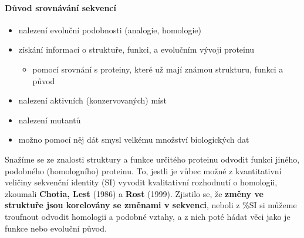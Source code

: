 \documentclass[DIV=8]{scrreprt}
\begin{document}
\paragraph{Důvod srovnávání sekvencí}
\begin{itemize}[nosep]
    \item nalezení evoluční podobnosti (analogie, homologie)
    \item získání informací o struktuře, funkci, a evolučním vývoji proteinu
\begin{itemize}[nosep]
    \item pomocí srovnání s proteiny, které už mají známou strukturu, funkci a původ
\end{itemize}

    \item nalezení aktivních (konzervovaných) míst
    \item nalezení mutantů
    \item možno pomocí něj dát smysl velkému množství biologických dat
\end{itemize}



Snažíme se ze znalosti struktury a funkce určitého proteinu odvodit funkci jiného, podobného (homologního) proteinu. To, jestli je vůbec možné z kvantitativní veličiny sekvenční identity (SI) vyvodit kvalitativní rozhodnutí o homologii, zkoumali \textbf{Chotia, Lest} (1986) a \textbf{Rost} (1999). Zjistilo se, že \textbf{změny ve struktuře jsou korelovány se změnami v sekvenci}, neboli z \%SI si můžeme troufnout odvodit homologii a podobné vztahy, a z nich poté hádat věci jako je funkce nebo evoluční původ.
\end{document}
